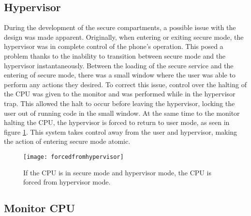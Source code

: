 
\subsection{Hypervisor}

\label{Ch6 Sec4 Sub1}

During the development of the secure compartments, a possible issue with the design was made apparent. Originally, when entering or exiting secure mode, the hypervisor was in complete control of the phone's operation. This posed a problem thanks to the inability to transition between secure mode and the hypervisor instantaneously. Between the loading of the secure service and the entering of secure mode, there was a small window where the user was able to perform any actions they desired. To correct this issue, control over the halting of the CPU was given to the monitor and was performed while in the hypervisor trap. This allowed the halt to occur before leaving the hypervisor, locking the user out of running code in the small window.  At the same time to the monitor halting the CPU, the hypervisor is forced to return to user mode, as seen in figure \ref{fig:forcedfromhypervisor}. This system takes control away from the user and hypervisor, making the action of entering secure mode atomic. 

\begin{figure}
  \centering
  \texttt{[image: forcedfromhypervisor]}
  \caption{If the CPU is in secure mode and hypervisor mode, the CPU is forced from hypervisor mode.}
  \label{fig:forcedfromhypervisor}
\end{figure}


\subsection{Monitor CPU}

\label{Ch6 Sec4 Sub2}

